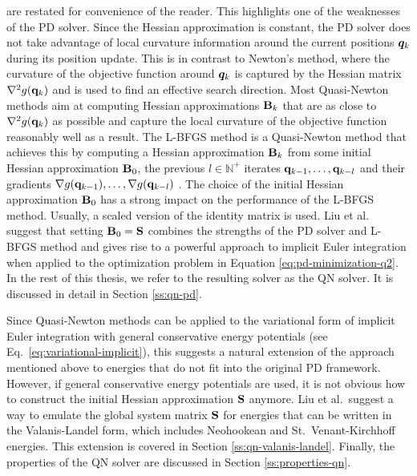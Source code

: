 \noindent are restated for convenience of the reader. This highlights one of the weaknesses of the PD solver. Since the Hessian approximation 
is constant, the PD solver does not take advantage of local curvature information around the current positions $\bm{q}_k$ during its position 
update. This is in contrast to Newton's method, where the curvature of the objective function around $\bm{q}_k$ is captured by the Hessian 
matrix $\nabla^2 g(\mathbf{q}_k)$ and is used to find an effective search direction. Most Quasi-Newton methods aim at computing Hessian 
approximations $\mathbf{B}_k$ that are as close to $\nabla^2 g(\mathbf{q}_k)$ as possible and capture the local curvature of the objective function 
reasonably well as a result. The L-BFGS method is a Quasi-Newton method that achieves this by computing a Hessian approximation $\mathbf{B}_k$ 
from some initial Hessian approximation $\mathbf{B}_0$, the previous $l \in \mathbb{N}^+$ iterates $\mathbf{q}_{k-1}, \ldots, \mathbf{q}_{k-l}$ 
and their gradients $\nabla g(\mathbf{q}_{k-1}), \ldots, \nabla g(\mathbf{q}_{k-l})$ \cite{nocedal2006}. The choice of the initial Hessian 
approximation $\mathbf{B}_0$ has a strong impact on the performance of the L-BFGS method. Usually, a scaled version of the identity matrix is 
used. Liu et al.\ \cite{liu2017} suggest that setting $\mathbf{B}_0 = \mathbf{S}$ combines the strengths of the PD solver and L-BFGS method 
and gives rise to a powerful approach to implicit Euler integration when applied to the optimization problem in Equation \ref{eq:pd-minimization-q2}.
In the rest of this thesis, we refer to the resulting solver as the QN solver. It is discussed in detail in Section \ref{ss:qn-pd}.

Since Quasi-Newton methods can be applied to the variational form of implicit Euler integration with general conservative energy potentials 
(see Eq.\ \ref{eq:variational-implicit}), this suggests a natural extension of the approach mentioned above to energies that do not fit into 
the original PD framework. However, if general conservative energy potentials are used, it is not obvious how to construct the initial Hessian 
approximation $\mathbf{S}$ anymore. Liu et al.\ suggest a way to emulate the global system matrix $\mathbf{S}$ for energies that can be written in
the Valanis-Landel form, which includes Neohookean and St.\ Venant-Kirchhoff energies. This extension is covered in Section 
\ref{ss:qn-valanis-landel}. Finally, the properties of the QN solver are discussed in Section \ref{ss:properties-qn}.


